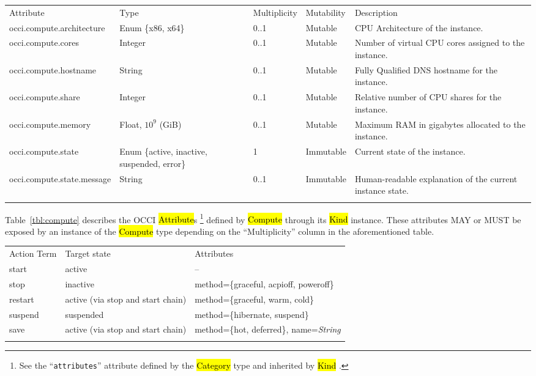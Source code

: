 \documentclass[10pt,a4paper]{article}
\begin{document}
{
	\begin{tabular}{lp{2.5cm}p{1cm}lp{5cm}}
	\toprule
	Attribute&Type&Multi\-plicity&Mutability&Description\\
	\colrule
	occi.compute.architecture & Enum \{x86, x64\} & 0..1
	& Mutable & CPU Architecture of the instance.\\
	occi.compute.cores & Integer & 0..1
	& Mutable & Number of virtual CPU cores assigned to the instance.\\
	occi.compute.hostname & String & 0..1
	& Mutable & Fully Qualified DNS hostname for the instance.\\
	occi.compute.share & Integer & 0..1
	& Mutable & Relative number of CPU shares for the instance.\\
	occi.compute.memory & Float, $10^9$ (GiB) & 0..1
	& Mutable & Maximum RAM in gigabytes allocated to the instance.\\
	occi.compute.state & Enum \{active, inactive, suspended, error\} & 1
	& Immutable & Current state of the instance.\\
	occi.compute.state.message & String & 0..1
	& Immutable & Human-readable explanation of the current instance state.\\
	\botrule
	\end{tabular}
}

Table~\ref{tbl:compute} describes the OCCI \hl{Attribute}s%
\footnote{See the ``{\tt attributes}'' attribute defined by the
  \hl{Category} type and inherited by \hl{Kind} \cite{occi:core}.}
defined by \hl{Compute} through its \hl{Kind} instance. These attributes
MAY or MUST be exposed by an instance of the \hl{Compute} type
depending on the ``Multiplicity'' column in the aforementioned table.

{
	\begin{tabular}{lll}
	\toprule
	Action Term & Target state & Attributes \\
	\colrule
	start & active & -- \\
	stop & inactive & method=\{graceful, acpioff, poweroff\} \\
	restart & active (via stop and start chain) & method=\{graceful, warm, cold\} \\
	suspend & suspended & method=\{hibernate, suspend\} \\
	save & active (via stop and start chain) & method=\{hot, deferred\}, name=\emph{String} \\
	\botrule
	\end{tabular}
}
\end{document}
